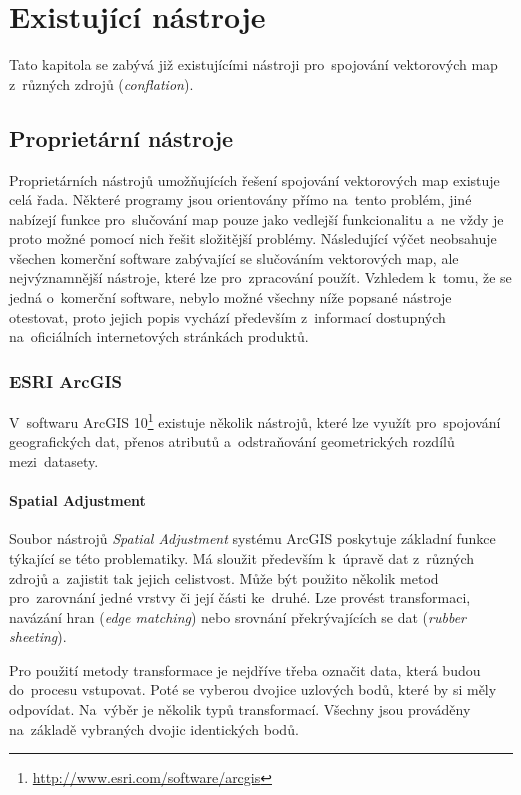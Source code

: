 \chapter{Existující nástroje}
\label{3-nastroje}

Tato kapitola se zabývá již existujícími nástroji pro~spojování vektorových map
 z~různých zdrojů (\textit{conflation}).

\section{Proprietární nástroje}
\label{proprietární}

Proprietárních nástrojů umožňujících řešení spojování vektorových map 
existuje celá řada. Některé programy jsou orientovány přímo na~tento problém,
jiné nabízejí funkce pro~slučování map pouze jako vedlejší funkcionalitu 
a~ne vždy je proto možné pomocí nich řešit složitější problémy. Následující
výčet neobsahuje všechen komerční software zabývající se slučováním
vektorových map, ale nejvýznamnější nástroje, které lze pro~zpracování 
použít. Vzhledem k~tomu, že se jedná o~komerční software, nebylo možné 
všechny níže popsané nástroje otestovat, proto jejich popis vychází 
především z~informací dostupných na~oficiálních internetových stránkách 
produktů.


\subsection{ESRI ArcGIS}
\label{arcgis}

V~softwaru ArcGIS 10\footnote{\url{http://www.esri.com/software/arcgis}} 
existuje několik nástrojů, které lze využít pro~spojování
geo\-grafických dat, přenos atributů a~odstraňování geometrických rozdílů 
mezi~datasety. 

\subsubsection{Spatial Adjustment}

Soubor nástrojů \textit{Spatial Adjustment} systému ArcGIS poskytuje 
základní funkce týkající se této problematiky. Má sloužit především 
k~úpravě dat z~různých zdrojů a~zajistit tak jejich celistvost. Může 
být použito několik metod pro~zarovnání jedné vrstvy či její části 
ke~druhé. Lze provést transformaci, navázání hran (\textit{edge matching})
nebo srovnání překrývajících se dat (\textit{rubber sheeting}).

Pro použití metody transformace je nejdříve třeba označit data, která budou
do~procesu vstupovat. Poté se vyberou dvojice uzlových bodů, které by si měly
odpovídat. Na~výběr je několik typů transformací. Všechny jsou prováděny 
na~základě vybraných dvojic identických bodů. 


